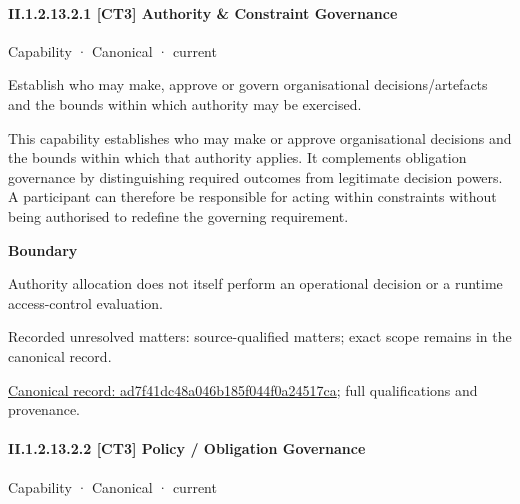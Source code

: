 \paragraph*{II.1.2.13.2.1 [CT3] Authority \& Constraint Governance}
\label{navigation:II.1.2.13.2.1}

\label{element:ad7f41dc48a046b185f044f0a24517ca}
{\small Capability · Canonical · current}\par

Establish who may make, approve or govern organisational decisions/artefacts and the bounds within which authority may be exercised.



This capability establishes who may make or approve organisational decisions and the bounds within which that authority applies. It complements obligation governance by distinguishing required outcomes from legitimate decision powers. A participant can therefore be responsible for acting within constraints without being authorised to redefine the governing requirement.



\textbf{Boundary}



Authority allocation does not itself perform an operational decision or a runtime access-control evaluation.


{\small Recorded unresolved matters: source-qualified matters; exact scope remains in the canonical record.}\par
{\footnotesize \href{../../../../../../../continuum/strategy/capability/ad7f41dc48a046b185f044f0a24517ca.md}{Canonical record: ad7f41dc48a046b185f044f0a24517ca}; full qualifications and provenance.}\par
\paragraph*{II.1.2.13.2.2 [CT3] Policy / Obligation Governance}
\label{navigation:II.1.2.13.2.2}

\label{element:73c6e5b36bdf4bf0ad2b8b50c9b9a00b}
{\small Capability · Canonical · current}\par

